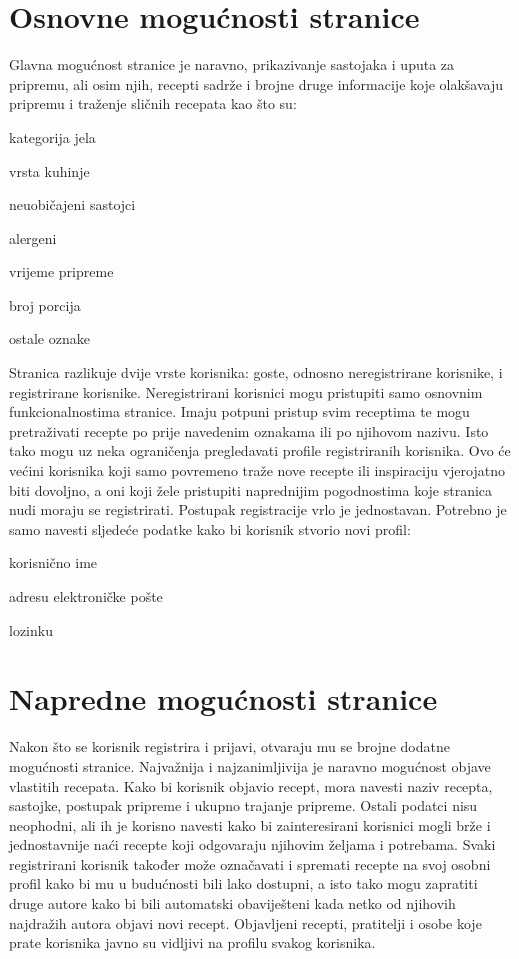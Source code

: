 		\section{Osnovne mogućnosti stranice}
		Glavna mogućnost stranice je naravno, prikazivanje sastojaka i uputa za pripremu, ali osim njih, recepti sadrže i brojne druge informacije koje olakšavaju pripremu i traženje sličnih recepata kao što su:
		\begin{packed_item}
			\item kategorija jela
			\item vrsta kuhinje
			\item neuobičajeni sastojci
			\item alergeni
			\item vrijeme pripreme
			\item broj porcija
			\item ostale oznake
		\end{packed_item}
		Stranica razlikuje dvije vrste korisnika: goste, odnosno neregistrirane korisnike, i registrirane korisnike. Neregistrirani korisnici mogu pristupiti samo osnovnim funkcionalnostima stranice. Imaju potpuni pristup svim receptima te mogu pretraživati recepte po prije navedenim oznakama ili po njihovom nazivu. Isto tako mogu uz neka ograničenja pregledavati profile registriranih korisnika. Ovo će većini korisnika koji samo povremeno traže nove recepte ili inspiraciju vjerojatno biti dovoljno, a oni koji žele pristupiti naprednijim pogodnostima koje stranica nudi moraju se registrirati.
		\linebreak
		Postupak registracije vrlo je jednostavan. Potrebno je samo navesti sljedeće podatke kako bi korisnik stvorio novi profil:
		\begin{packed_item}
			\item korisnično ime
			\item adresu elektroničke pošte
			\item lozinku
		\end{packed_item}
		
		\section{Napredne mogućnosti stranice}
		Nakon što se korisnik registrira i prijavi, otvaraju mu se brojne dodatne mogućnosti stranice. Najvažnija i najzanimljivija je naravno mogućnost objave vlastitih recepata. Kako bi korisnik objavio recept, mora navesti naziv recepta, sastojke, postupak pripreme i ukupno trajanje pripreme. Ostali podatci nisu neophodni, ali ih je korisno navesti kako bi zainteresirani korisnici mogli brže i jednostavnije naći recepte koji odgovaraju njihovim željama i potrebama.
		\linebreak
		\linebreak
		Svaki registrirani korisnik također može označavati i spremati recepte na svoj osobni profil kako bi mu u budućnosti bili lako dostupni, a isto tako mogu zapratiti druge autore kako bi bili automatski obaviješteni kada netko od njihovih najdražih autora objavi novi recept.
		Objavljeni recepti, pratitelji i osobe koje prate korisnika javno su vidljivi na profilu svakog korisnika.
